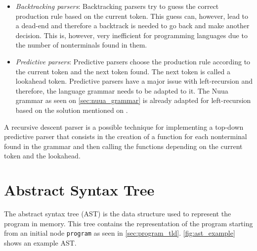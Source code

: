 \begin{itemize}
    \item \emph{Backtracking parsers}: Backtracking parsers try to guess the correct production rule based on the current token. This guess can, however, lead to a
        dead-end and therefore a backtrack is needed to go back and make another decision. This is, however, very inefficient for programming languages due to the number of nonterminals found in them.
    \item \emph{Predictive parsers}: Predictive parsers choose the production rule according to the current token and the next token found. The next token is called
        a lookahead token. Predictive parsers have a major issue with left-recursion and therefore, the language grammar needs to be adapted to it.
        The Nuua grammar as seen on \autoref{sec:nuua_grammar} is already adapted for left-recursion based on the solution mentioned on
        \autocite[Section~6]{crafting_interpreters}.
\end{itemize}

A recursive descent parser is a possible technique for implementing a top-down predictive parser that consists in the creation of a function for each
nonterminal found in the grammar and then calling the functions depending on the current token and the lookahead.

\section{Abstract Syntax Tree}

The abstract syntax tree (AST) is the data structure used to represent the program in memory. This tree contains the
representation of the program starting from an initial node \texttt{program} as seen in \autoref{sec:program_tld}.
\autoref{fig:ast_example} shows an example AST.

